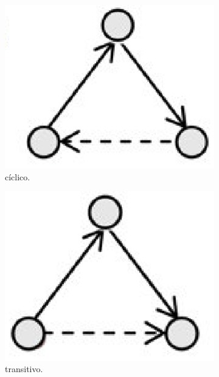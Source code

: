 \begin{figure}
	\begin{subfigure}{.25\textwidth}
  		\centering
  		\includegraphics[width=.9\linewidth]{figuras/opfecho_a.eps}
  		\caption{cíclico.}
  		\label{fig:subop1}
	\end{subfigure}%
		\begin{subfigure}{.25\textwidth}
  		\centering
  		\includegraphics[width=.9\linewidth]{figuras/opfecho_b.eps}
  		\caption{transitivo.}
  		\label{fig:subop2}
	\end{subfigure}%
		\begin{subfigure}{.25\textwidth}
  		\centering

\end{subfigure}
\end{figure}
